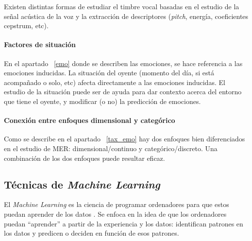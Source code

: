 \documentclass[12pt,a4paper]{article}
\begin{document}
Existen distintas formas de estudiar el timbre vocal basadas en el estudio de la señal acústica de la voz y la extracción de descriptores (\textit{pitch}, energía, coeficientes cepstrum, etc).

\paragraph{Factores de situación}
En el apartado ~\ref{emo} donde se describen las emociones, se hace referencia a las emociones inducidas. La situación del oyente (momento del día, si está acompañado o solo, etc) afecta directamente a las emociones inducidas. El estudio de la situación puede ser de ayuda para dar contexto acerca del entorno que tiene el oyente, y modificar (o no) la predicción de emociones.

\paragraph{Conexión entre enfoques dimensional y categórico}\label{combi}
Como se describe en el apartado ~\ref{tax_emo} hay dos enfoques bien diferenciados en el estudio de MER: dimensional/continuo y categórico/discreto. Una combinación de los dos enfoques puede resultar eficaz.

\subsection{Técnicas de \textit{Machine Learning}}

El \textit{Machine Learning} es la ciencia de programar ordenadores para que estos puedan aprender de los datos \cite{geron2022hands}. Se enfoca en la idea de que los ordenadores puedan ``aprender'' a partir de la experiencia y los datos: identifican patrones en los datos y predicen o deciden en función de esos patrones.
\end{document}
